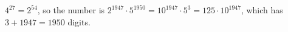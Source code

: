 $4^{27}=2^{54}$, so the number is $2^{1947}\cdot5^{1950}=10^{1947}\cdot5^3=125\cdot10^{1947}$, which has $3+1947=\boxed{1950}$ digits.
